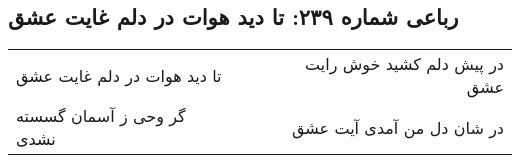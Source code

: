 \begin{center}
\section*{رباعی شماره ۲۳۹: تا دید هوات در دلم غایت عشق}
\label{sec:sh239}
\begin{longtable}{l p{0.5cm} r}
تا دید هوات در دلم غایت عشق
&&
در پیش دلم کشید خوش رایت عشق
\\
گر وحی ز آسمان گسسته نشدی
&&
در شان دل من آمدی آیت عشق
\\
\end{longtable}
\end{center}
